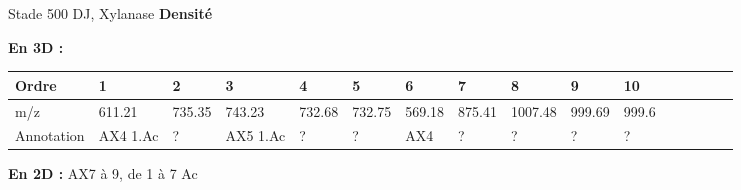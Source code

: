 \documentclass[10pt]{beamer}
\begin{document}
\begin{frame}{Stade 500 DJ, Xylanase}
  \textbf{Densité}

  \textbf{En 3D :}
  \vspace{-0.4cm}
    \begin{table}[]
    \centering
    \begin{adjustbox}{max width=1\textwidth}
      \begin{tabular}{llllllllllllllll}
        \toprule
        Ordre & 1       & 2       & 3       & 4       & 5       & 6       & 7       & 8       & 9       & 10       \\
        \midrule
        m/z &   611.21 & 735.35 & 743.23 & 732.68 & 732.75 & 569.18 & 875.41 & 1007.48 & 999.69 & 999.6 \\  
        Annotation &  AX4 1.Ac & ? & AX5 1.Ac & ? & ? & AX4 & ? & ? & ? & ?\\
        \bottomrule
      \end{tabular}
    \end{adjustbox}
  \end{table}

  \textbf{En 2D :} AX7 à 9, de 1 à 7 Ac


\end{frame}
\end{document}
